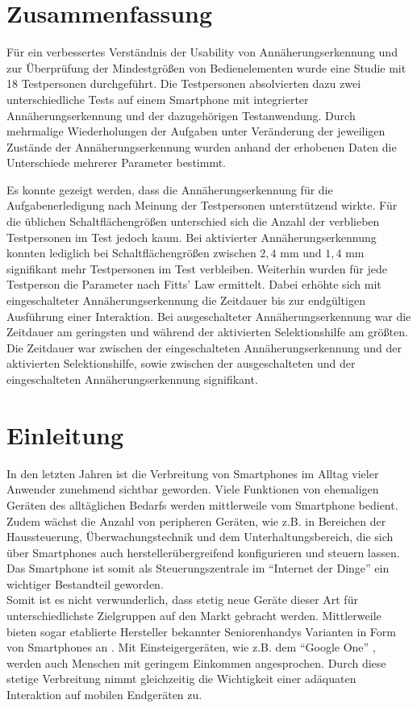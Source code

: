 \documentclass[12pt,numbers=noenddot,parskip,bibliography=totocnumbered,listof=totocnumbered]{scrreprt}
\begin{document}
\tableofcontents
\thispagestyle{nochapternumber}

\chapter*{Zusammenfassung}
Für ein verbessertes Verständnis der Usability von Annäherungserkennung und zur Überprüfung der Mindestgrößen von Bedienelementen wurde eine Studie mit 18 Testpersonen durchgeführt. Die Testpersonen absolvierten dazu zwei unterschiedliche Tests auf einem Smartphone mit integrierter Annäherungserkennung und der dazugehörigen Testanwendung. Durch mehrmalige Wiederholungen der Aufgaben unter Veränderung der jeweiligen Zustände der Annäherungserkennung wurden anhand der erhobenen Daten die Unterschiede mehrerer Parameter bestimmt.

Es konnte gezeigt werden, dass die Annäherungserkennung für die Aufgabenerledigung nach Meinung der Testpersonen unterstützend wirkte. Für die üblichen Schaltflächengrößen unterschied sich die Anzahl der verblieben Testpersonen im Test jedoch kaum. Bei aktivierter Annäherungserkennung konnten lediglich bei Schaltflächengrößen zwischen $2{,}4$ mm  und $1{,}4$ mm signifikant mehr Testpersonen im Test verbleiben. Weiterhin wurden für jede Testperson die Parameter nach Fitts' Law ermittelt. Dabei erhöhte sich mit eingeschalteter Annäherungserkennung die Zeitdauer bis zur endgültigen Ausführung einer Interaktion. Bei ausgeschalteter Annäherungserkennung war die Zeitdauer am geringsten und während der aktivierten Selektionshilfe am größten. Die Zeitdauer war zwischen der eingeschalteten Annäherungserkennung und der aktivierten Selektionshilfe, sowie zwischen der ausgeschalteten und der eingeschalteten Annäherungserkennung signifikant.

\chapter{Einleitung}
In den letzten Jahren ist die Verbreitung von Smartphones im Alltag vieler Anwender zunehmend sichtbar geworden. Viele Funktionen von ehemaligen Geräten des alltäglichen Bedarfs werden mittlerweile vom Smartphone bedient. Zudem wächst die Anzahl von peripheren Geräten, wie z.B. in Bereichen der Haussteuerung, Überwachungstechnik und dem Unterhaltungsbereich, die sich über Smartphones auch herstellerübergreifend konfigurieren und steuern lassen. Das Smartphone ist somit als Steuerungszentrale im "`Internet der Dinge"' ein wichtiger Bestandteil geworden.\\
Somit ist es nicht verwunderlich, dass stetig neue Geräte dieser Art für unterschiedlichste Zielgruppen auf den Markt gebracht werden. Mittlerweile bieten sogar etablierte Hersteller bekannter Seniorenhandys Varianten in Form von Smartphones an \citep{dorol}. Mit Einsteigergeräten, wie z.B. dem "`Google One"' \citep{gOne}, werden auch Menschen mit geringem Einkommen angesprochen. Durch diese stetige Verbreitung nimmt gleichzeitig die Wichtigkeit einer adäquaten Interaktion auf mobilen Endgeräten zu.
\end{document}
